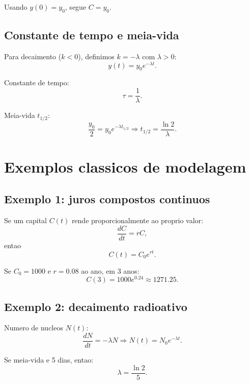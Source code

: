 \documentclass[12pt,a4paper,oneside]{book}
\theoremstyle{definition}
\begin{document}
Usando $y(0)=y_0$, segue $C=y_0$.

\subsection{Constante de tempo e meia-vida}

Para decaimento ($k<0$), definimos $k=-\lambda$ com $\lambda>0$:
\begin{equation}
y(t)=y_0e^{-\lambda t}.
\end{equation}

Constante de tempo:
\begin{equation}
\tau=\frac{1}{\lambda}.
\end{equation}

Meia-vida $t_{1/2}$:
\begin{equation}
\frac{y_0}{2}=y_0e^{-\lambda t_{1/2}} \Rightarrow t_{1/2}=\frac{\ln 2}{\lambda}.
\end{equation}

\section{Exemplos classicos de modelagem}

\subsection{Exemplo 1: juros compostos continuos}

Se um capital $C(t)$ rende proporcionalmente ao proprio valor:
\begin{equation}
\frac{dC}{dt}=rC,
\end{equation}
entao
\begin{equation}
C(t)=C_0e^{rt}.
\end{equation}

Se $C_0=1000$ e $r=0.08$ ao ano, em 3 anos:
\begin{equation}
C(3)=1000e^{0.24}\approx 1271.25.
\end{equation}

\subsection{Exemplo 2: decaimento radioativo}

Numero de nucleos $N(t)$:
\begin{equation}
\frac{dN}{dt}=-\lambda N \Rightarrow N(t)=N_0e^{-\lambda t}.
\end{equation}

Se meia-vida e 5 dias, entao:
\begin{equation}
\lambda=\frac{\ln 2}{5}.
\end{equation}
\end{document}
